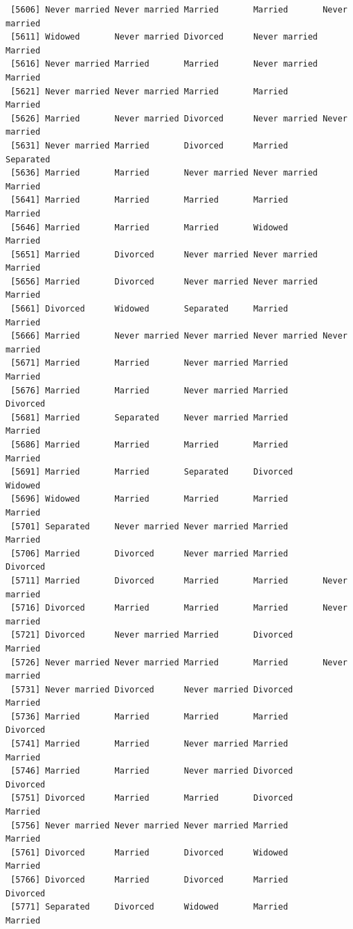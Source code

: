 \documentclass[
  letterpaper,
  DIV=11,
  numbers=noendperiod,
  oneside]{scrartcl}
\begin{document}
\begin{verbatim}
 [5606] Never married Never married Married       Married       Never married
 [5611] Widowed       Never married Divorced      Never married Married      
 [5616] Never married Married       Married       Never married Married      
 [5621] Never married Never married Married       Married       Married      
 [5626] Married       Never married Divorced      Never married Never married
 [5631] Never married Married       Divorced      Married       Separated    
 [5636] Married       Married       Never married Never married Married      
 [5641] Married       Married       Married       Married       Married      
 [5646] Married       Married       Married       Widowed       Married      
 [5651] Married       Divorced      Never married Never married Married      
 [5656] Married       Divorced      Never married Never married Married      
 [5661] Divorced      Widowed       Separated     Married       Married      
 [5666] Married       Never married Never married Never married Never married
 [5671] Married       Married       Never married Married       Married      
 [5676] Married       Married       Never married Married       Divorced     
 [5681] Married       Separated     Never married Married       Married      
 [5686] Married       Married       Married       Married       Married      
 [5691] Married       Married       Separated     Divorced      Widowed      
 [5696] Widowed       Married       Married       Married       Married      
 [5701] Separated     Never married Never married Married       Married      
 [5706] Married       Divorced      Never married Married       Divorced     
 [5711] Married       Divorced      Married       Married       Never married
 [5716] Divorced      Married       Married       Married       Never married
 [5721] Divorced      Never married Married       Divorced      Married      
 [5726] Never married Never married Married       Married       Never married
 [5731] Never married Divorced      Never married Divorced      Married      
 [5736] Married       Married       Married       Married       Divorced     
 [5741] Married       Married       Never married Married       Married      
 [5746] Married       Married       Never married Divorced      Divorced     
 [5751] Divorced      Married       Married       Divorced      Married      
 [5756] Never married Never married Never married Married       Married      
 [5761] Divorced      Married       Divorced      Widowed       Married      
 [5766] Divorced      Married       Divorced      Married       Divorced     
 [5771] Separated     Divorced      Widowed       Married       Married      

\end{verbatim}
\end{document}
